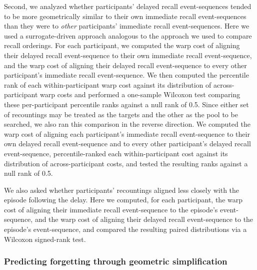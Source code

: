 \documentclass[10pt]{article}
\begin{document}
Second, we analyzed whether participants' delayed recall event-sequences tended to be more geometrically similar to their own immediate recall event-sequences than they were to \textit{other} participants' immediate recall event-sequences.
Here we used a surrogate-driven approach analogous to the approach we used to compare recall orderings.
For each participant, we computed the warp cost of aligning their delayed recall event-sequence to their own immediate recall event-sequence, and the warp cost of aligning their delayed recall event-sequence to every other participant's immediate recall event-sequence.
We then computed the percentile rank of each within-participant warp cost against its distribution of across-participant warp costs and performed a one-sample Wilcoxon test comparing these per-participant percentile ranks against a null rank of 0.5.
Since either set of recountings may be treated as the targets and the other as the pool to be searched, we also ran this comparison in the reverse direction.
We computed the warp cost of aligning each participant's immediate recall event-sequence to their own delayed recall event-sequence and to every other participant's delayed recall event-sequence, percentile-ranked each within-participant cost against its distribution of across-participant costs, and tested the resulting ranks against a null rank of 0.5.

We also asked whether participants' recountings aligned less closely with the episode following the delay.
Here we computed, for each participant, the warp cost of aligning their immediate recall event-sequence to the episode's event-sequence, and the warp cost of aligning their delayed recall event-sequence to the episode's event-sequence, and compared the resulting paired distributions via a Wilcoxon signed-rank test.


\subsubsection*{Predicting forgetting through geometric simplification}\label{subsec:rdp}
\end{document}
